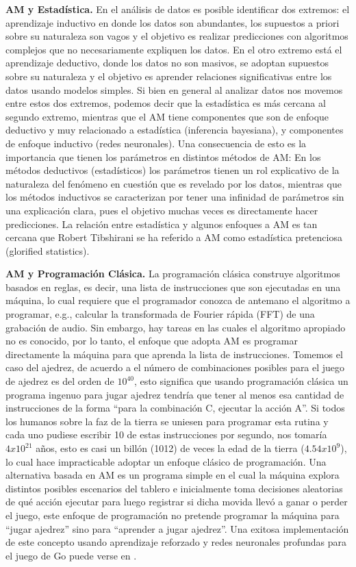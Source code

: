 \textbf{AM y Estadística.} En el análisis de datos es posible identificar dos extremos: el aprendizaje inductivo en donde los datos son abundantes, los supuestos a priori sobre su naturaleza son vagos y el objetivo es realizar predicciones con algoritmos complejos que no necesariamente expliquen los datos. En el otro extremo está el aprendizaje deductivo, donde los datos no son masivos, se adoptan supuestos sobre su naturaleza y el objetivo es aprender relaciones significativas entre los datos usando modelos simples. Si bien en general al analizar datos nos movemos entre estos dos extremos, podemos decir que la estadística es más cercana al segundo extremo, mientras que el AM tiene componentes que son de enfoque deductivo y muy relacionado a estadística (inferencia bayesiana), y componentes de enfoque inductivo (redes neuronales). Una consecuencia de esto es la importancia que tienen los parámetros en distintos métodos de AM: En los métodos deductivos (estadísticos) los parámetros tienen un rol explicativo de la naturaleza del fenómeno en cuestión que es revelado por los datos, mientras que los métodos inductivos se caracterizan por tener una infinidad de parámetros sin una explicación clara, pues el objetivo muchas veces es directamente hacer predicciones. La relación entre estadística y algunos enfoques a AM es tan cercana que Robert Tibshirani se ha referido a AM como estadística pretenciosa (glorified statistics).

\textbf{AM y Programación Clásica.} La programación clásica construye algoritmos basados en reglas, es decir, una lista de instrucciones que son ejecutadas en una máquina, lo cual requiere que el programador conozca de antemano el algoritmo a programar, e.g., calcular la transformada de Fourier rápida (FFT) de una grabación de audio. Sin embargo, hay tareas en las cuales el algoritmo apropiado no es conocido, por lo tanto, el enfoque que adopta AM es programar directamente la máquina para que aprenda la lista de instrucciones. Tomemos el caso del ajedrez, de acuerdo a \cite{shannon_1950} el número de combinaciones posibles para el juego de ajedrez es del orden de $10^40$, esto significa que usando programación clásica un programa ingenuo para jugar ajedrez tendría que tener al menos esa cantidad de instrucciones de la forma “para la combinación C, ejecutar la acción A”. Si todos los humanos sobre la faz de la tierra se uniesen para programar esta rutina y cada uno pudiese escribir 10 de estas instrucciones por segundo, nos tomaría $4x10^{21}$ años, esto es casi un billón (1012) de veces la edad de la tierra ($4.54x10^9$), lo cual hace impracticable adoptar un enfoque clásico de programación. Una alternativa basada en AM es un programa simple en el cual la máquina explora distintos posibles escenarios del tablero e inicialmente toma decisiones aleatorias de qué acción ejecutar para luego registrar si dicha movida llevó a ganar o perder el juego, este enfoque de programación no pretende programar la máquina para “jugar ajedrez” sino para “aprender a jugar ajedrez”. Una exitosa implementación de este concepto usando aprendizaje reforzado y redes neuronales profundas para el juego de Go puede verse en \cite{silver_2016}.


